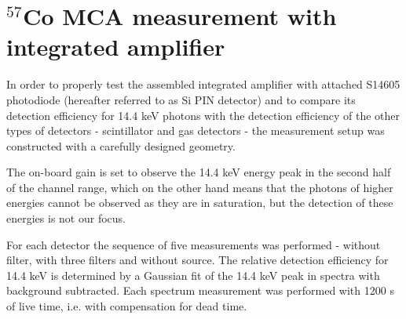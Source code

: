 \chapter{$^{57}$Co MCA measurement with integrated amplifier} 
In order to properly test the assembled integrated amplifier with attached S14605 photodiode (hereafter referred to as Si PIN detector) and to compare its detection efficiency for 14.4 keV photons with the detection efficiency of the other types of detectors - scintillator and gas detectors - the measurement setup was constructed with a carefully designed geometry.
\par
The on-board gain is set to observe the 14.4 keV energy peak in the second half of the channel range, which on the other hand means that the photons of higher energies cannot be observed as they are in saturation, but the detection of these energies is not our focus.
\par
For each detector the sequence of five measurements was performed - without filter, with three filters and without source. The relative detection efficiency for 14.4 keV is determined by a Gaussian fit of the 14.4 keV peak in spectra with background subtracted. Each spectrum measurement was performed with 1200 s of live time, i.e. with compensation for dead time. 




